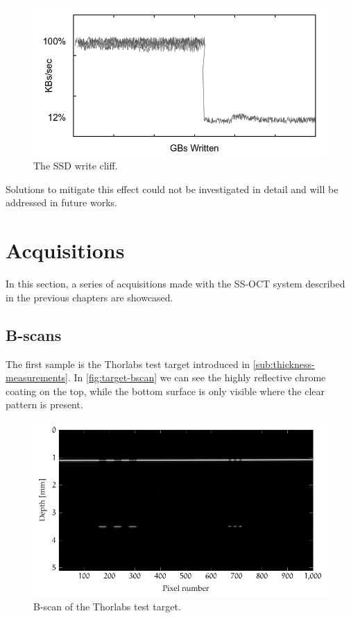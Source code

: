 \begin{figure}[htb]
	\myfloatalign
	\includegraphics[width=0.8\linewidth]{gfx/ch4/write-cliff}
	\caption{The SSD write cliff.}\label{fig:write-cliff}
\end{figure}

Solutions to mitigate this effect could not be investigated in detail and will be addressed in future works. 

\clearpage
\section{Acquisitions}
In this section, a series of acquisitions made with the SS-OCT system described in the previous chapters are showcased.
\subsection{B-scans}
The first sample is the Thorlabs test target introduced in \autoref{sub:thickness-measurements}. In \autoref{fig:target-bscan} we can see the highly reflective chrome coating on the top, while the bottom surface is only visible where the clear pattern is present.
\begin{figure}[hbt]
	\centering
	\includegraphics[width=0.8\linewidth]{gfx/ch4/axsun/target-bscan}
	\caption{B-scan of the Thorlabs test target.}\label{fig:target-bscan}
\end{figure}%


